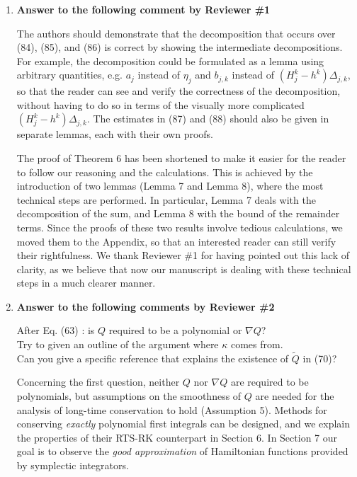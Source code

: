 \documentclass[10pt]{article}
\begin{document}
\begin{enumerate}
	\item \textbf{Answer to the following comment by Reviewer \#1}
	\begin{itquote}
		The authors should demonstrate that the decomposition that occurs over (84), (85), and (86) is correct by showing the intermediate decompositions. For example, the decomposition could be formulated as a lemma using arbitrary quantities, e.g. $a_j$ instead of $\eta_j$ and $b_{j,k}$ instead of $(H^k_j-h^k)\Delta_{j,k}$, so that the reader can see and verify the correctness of the decomposition, without having to do so in terms of the visually more complicated $(H^k_j-h^k)\Delta_{j,k}$. The estimates in (87) and (88) should also be given in separate lemmas, each with their own proofs.
	\end{itquote}
	The proof of Theorem 6 has been shortened to make it easier for the reader to follow our reasoning and the calculations. This is achieved by the introduction of two lemmas (Lemma 7 and Lemma 8), where the most technical steps are performed. In particular, Lemma 7 deals with the decomposition of the sum, and Lemma 8 with the bound of the remainder terms. Since the proofs of these two results involve tedious calculations, we moved them to the Appendix, so that an interested reader can still verify their rightfulness. We thank Reviewer \#1 for having pointed out this lack of clarity, as we believe that now our manuscript is dealing with these technical steps in a much clearer manner.
	\item \textbf{Answer to the following comments by Reviewer \#2}
	\begin{itquote}
		After Eq. (63) {}: is $Q$ required to be a polynomial or $\nabla Q$?\\
		Try to given an outline of the argument where $\kappa$ comes from.\\
		Can you give a specific reference that explains the existence of $\tilde Q$ in (70)?
	\end{itquote}
	Concerning the first question, neither $Q$ nor $\nabla Q$ are required to be polynomials, but assumptions on the smoothness of $Q$ are needed for the analysis of long-time conservation to hold (Assumption 5). Methods for conserving \textit{exactly} polynomial first integrals can be designed, and we explain the properties of their RTS-RK counterpart in Section 6. In Section 7 our goal is to observe the \textit{good approximation} of Hamiltonian functions provided by symplectic integrators.\\

\end{enumerate}
\end{document}
